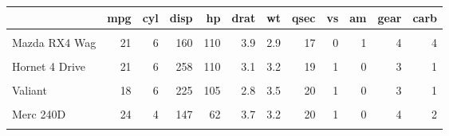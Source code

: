 \documentclass{article}
\begin{document}
\begin{table}
\centering
\begin{tabular}{lrrrrrrrrrrr}
\toprule
\textbf{ } & \textbf{mpg} & \textbf{cyl} & \textbf{disp} & \textbf{hp} & \textbf{drat} & \textbf{wt} & \textbf{qsec} & \textbf{vs} & \textbf{am} & \textbf{gear} & \textbf{carb}\\
\midrule
\cellcolor{blue!10}{Mazda RX4} & \cellcolor{blue!10}{21} & \cellcolor{blue!10}{6} & \cellcolor{blue!10}{160} & \cellcolor{blue!10}{110} & \cellcolor{blue!10}{3.9} & \cellcolor{blue!10}{2.6} & \cellcolor{blue!10}{16} & \cellcolor{blue!10}{0} & \cellcolor{blue!10}{1} & \cellcolor{blue!10}{4} & \cellcolor{blue!10}{4}\\
Mazda RX4 Wag & 21 & 6 & 160 & 110 & 3.9 & 2.9 & 17 & 0 & 1 & 4 & 4\\
\cellcolor{blue!10}{Datsun 710} & \cellcolor{blue!10}{23} & \cellcolor{blue!10}{4} & \cellcolor{blue!10}{108} & \cellcolor{blue!10}{93} & \cellcolor{blue!10}{3.9} & \cellcolor{blue!10}{2.3} & \cellcolor{blue!10}{19} & \cellcolor{blue!10}{1} & \cellcolor{blue!10}{1} & \cellcolor{blue!10}{4} & \cellcolor{blue!10}{1}\\
Hornet 4 Drive & 21 & 6 & 258 & 110 & 3.1 & 3.2 & 19 & 1 & 0 & 3 & 1\\
\cellcolor{blue!10}{Hornet Sportabout} & \cellcolor{blue!10}{19} & \cellcolor{blue!10}{8} & \cellcolor{blue!10}{360} & \cellcolor{blue!10}{175} & \cellcolor{blue!10}{3.1} & \cellcolor{blue!10}{3.4} & \cellcolor{blue!10}{17} & \cellcolor{blue!10}{0} & \cellcolor{blue!10}{0} & \cellcolor{blue!10}{3} & \cellcolor{blue!10}{2}\\
\addlinespace
Valiant & 18 & 6 & 225 & 105 & 2.8 & 3.5 & 20 & 1 & 0 & 3 & 1\\
\cellcolor{blue!10}{Duster 360} & \cellcolor{blue!10}{14} & \cellcolor{blue!10}{8} & \cellcolor{blue!10}{360} & \cellcolor{blue!10}{245} & \cellcolor{blue!10}{3.2} & \cellcolor{blue!10}{3.6} & \cellcolor{blue!10}{16} & \cellcolor{blue!10}{0} & \cellcolor{blue!10}{0} & \cellcolor{blue!10}{3} & \cellcolor{blue!10}{4}\\
Merc 240D & 24 & 4 & 147 & 62 & 3.7 & 3.2 & 20 & 1 & 0 & 4 & 2\\
\cellcolor{blue!10}{Merc 230} & \cellcolor{blue!10}{23} & \cellcolor{blue!10}{4} & \cellcolor{blue!10}{141} & \cellcolor{blue!10}{95} & \cellcolor{blue!10}{3.9} & \cellcolor{blue!10}{3.1} & \cellcolor{blue!10}{23} & \cellcolor{blue!10}{1} & \cellcolor{blue!10}{0} & \cellcolor{blue!10}{4} & \cellcolor{blue!10}{2}\\

\end{tabular}
\end{table}
\end{document}
